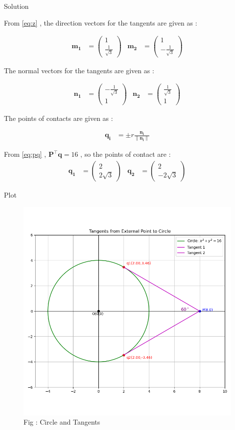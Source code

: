 \documentclass{beamer}
\numberwithin{equation}{section}
\theoremstyle{remark}
\providecommand{\norm}[1]{\lVert#1\rVert}
\newcommand{\myvec}[1]{\ensuremath{\begin{pmatrix}#1\end{pmatrix}}}
\let\vec\mathbf
\begin{document}
\begin{frame}{Solution}

From \eqref{eq:z} , the direction vectors for the tangents are given as :

\begin{align}
  \vec{m_1} &= \myvec{1\\\tfrac{1}{\sqrt{3}}} & \vec{m_2} &= \myvec{1\\-\tfrac{1}{\sqrt{3}}}
\end{align}

The normal vectors for the tangents are given as :

\begin{align}
  \vec{n_1} &= \myvec{-\tfrac{1}{\sqrt{3}}\\1} & \vec{n_2} &= \myvec{\tfrac{1}{\sqrt{3}}\\1} 
\end{align}

The points of contacts are given as :

\begin{align}
  \vec{q_i} &= \pm r \frac{\vec{n_i}}{\norm{\vec{n_i}}}
\end{align}

From \eqref{eq:pq} , $\vec{P}^\top\vec{q}=16$ , so the points of contact are :
\begin{align}
  \vec{q_1} &= \myvec{2\\2\sqrt{3}} & \vec{q_2} &= \myvec{2\\-2\sqrt{3}}
\end{align}

\end{frame}

\begin{frame}{Plot}

\begin{figure}[h!]
  \centering
  \includegraphics[width=0.6\columnwidth]{figs/circle_tangents.png} 
   \caption*{Fig : Circle and Tangents}
  \label{Fig1}
\end{figure}

\end{frame}
\end{document}
